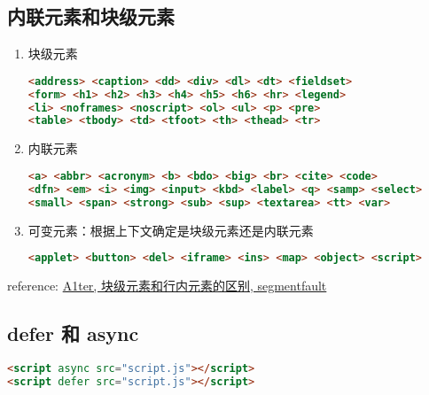 \subsection{内联元素和块级元素}\label{ux5185ux8054ux5143ux7d20ux548cux5757ux7ea7ux5143ux7d20}

\begin{enumerate}
\def\labelenumi{\arabic{enumi}.}
\item
  块级元素

\begin{lstlisting}[language=HTML]
<address> <caption> <dd> <div> <dl> <dt> <fieldset>
<form> <h1> <h2> <h3> <h4> <h5> <h6> <hr> <legend>
<li> <noframes> <noscript> <ol> <ul> <p> <pre>
<table> <tbody> <td> <tfoot> <th> <thead> <tr>
\end{lstlisting}
\item
  内联元素

\begin{lstlisting}[language=HTML]
<a> <abbr> <acronym> <b> <bdo> <big> <br> <cite> <code>
<dfn> <em> <i> <img> <input> <kbd> <label> <q> <samp> <select>
<small> <span> <strong> <sub> <sup> <textarea> <tt> <var>
\end{lstlisting}
\item
  可变元素：根据上下文确定是块级元素还是内联元素

\begin{lstlisting}[language=HTML]
<applet> <button> <del> <iframe> <ins> <map> <object> <script>
\end{lstlisting}
\end{enumerate}

reference: \href{http://segmentfault.com/a/1190000003714074}{A1ter,
块级元素和行内元素的区别, segmentfault}

\subsection{defer 和 async}\label{defer-ux548c-async}

\begin{lstlisting}[language=HTML]
<script async src="script.js"></script>
<script defer src="script.js"></script>
\end{lstlisting}

